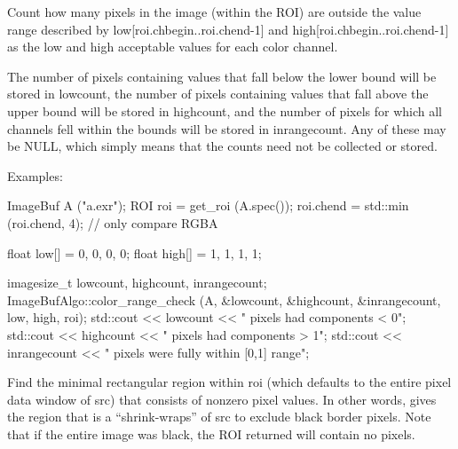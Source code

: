  

Count how many pixels in the image (within the ROI) are outside the
value range described by {\cf low[roi.chbegin..roi.chend-1]} and
{\cf high[roi.chbegin..roi.chend-1]} 
as the low and high acceptable values for each color channel.  

The number of pixels containing values that fall below the lower bound
will be stored in {\cf *lowcount}, the number of pixels containing
values that fall above the upper bound will be stored in 
{\cf *highcount}, and the number of pixels for which all channels fell
within the bounds will be stored in {\cf *inrangecount}.  Any of these
may be NULL, which simply means that the counts need not be collected or
stored.

\smallskip
\noindent Examples:
\begin{code}
    ImageBuf A ("a.exr");
    ROI roi = get_roi (A.spec());
    roi.chend = std::min (roi.chend, 4);  // only compare RGBA

    float low[] = {0, 0, 0, 0};
    float high[] = {1, 1, 1, 1};

    imagesize_t lowcount, highcount, inrangecount;
    ImageBufAlgo::color_range_check (A, &lowcount, &highcount, &inrangecount,
                                     low, high, roi);
    std::cout << lowcount << " pixels had components < 0\n";
    std::cout << highcount << " pixels had components > 1\n";
    std::cout << inrangecount << " pixels were fully within [0,1] range\n";
\end{code}
\apiend


 

Find the minimal rectangular region within {\cf roi} (which defaults to
the entire pixel data window of {\cf src}) that consists of nonzero pixel
values.  In other words, gives the region that is a ``shrink-wraps''
of {\cf src} to exclude black border pixels.  Note that if the entire
image was black, the ROI returned will contain no pixels.


